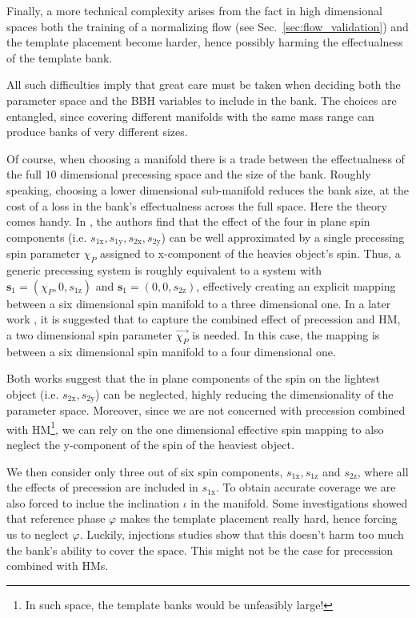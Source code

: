 \documentclass[twocolumn,showpacs,preprintnumbers,nofootinbib,prd,
superscriptaddress,10pt]{revtex4-2}
\begin{document}
Finally, a more technical complexity arises from the fact in high dimensional spaces both the training of a normalizing flow (see Sec.~\ref{sec:flow_validation}) and the template placement become harder, hence possibly harming the effectualness of the template bank.

All such difficulties imply that great care must be taken when deciding both the parameter space and the BBH variables to include in the bank.
The choices are entangled, since covering different manifolds with the same mass range can produce banks of very different sizes.

Of course, when choosing a manifold there is a trade between the effectualness of the full $10$ dimensional precessing space and the size of the bank. Roughly speaking, choosing a lower dimensional sub-manifold reduces the bank size, at the cost of a loss in the bank's effectualness across the full space.
Here the theory comes handy. In \cite{Schmidt:2014iyl}, the authors find that the effect of the four in plane spin components (i.e. $s_\text{1x}, s_\text{1y}, s_\text{2x}, s_\text{2y}$) can be well approximated by a single precessing spin parameter $\chi_P$ assigned to x-component of the heavies object's spin.
Thus, a generic precessing system is roughly equivalent to a system with $\mathbf{s}_\text{1} = (\chi_P, 0, s_\text{1z})$ and $\mathbf{s}_\text{1} = (0, 0, s_\text{2z})$, effectively creating an explicit mapping between a six dimensional spin manifold to a three dimensional one.
In a later work \cite{Thomas:2020uqj}, it is suggested that to capture the combined effect of precession and HM, a two dimensional spin parameter $\vec{\chi_P}$ is needed. In this case, the mapping is between  a six dimensional spin manifold to a four dimensional one.

Both works suggest that the in plane components of the spin on the lightest object (i.e. $s_\text{2x}, s_\text{2y}$) can be neglected, highly reducing the dimensionality of the parameter space.
Moreover, since we are not concerned with precession combined with HM\footnote{In such space, the template banks would be unfeasibly large!}, we can rely on the one dimensional effective spin mapping \cite{Schmidt:2014iyl} to also neglect the y-component of the spin of the heaviest object.

We then consider only three out of six spin components, $s_\text{1x}, s_\text{1z}$ and $s_\text{2z}$, where all the effects of precession are included in $s_\text{1x}$. To obtain accurate coverage we are also forced to inclue the inclination $\iota$ in the manifold. Some investigations showed that reference phase $\varphi$ makes the template placement really hard, hence forcing us to neglect $\varphi$. Luckily, injections studies show that this doesn't harm too much the bank's ability to cover the space. This might not be the case for precession combined with HMs.
\end{document}

